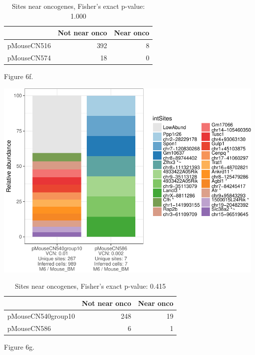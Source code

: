 \documentclass[12pt,]{article}
\begin{document}
\begin{table}[!h]

\caption{\label{tab:unnamed-chunk-3}Sites near oncogenes, Fisher's exact p-value: 1.000}
\centering
\begin{tabular}[t]{lrr}
\toprule
  & Not near onco & Near onco\\
\midrule
pMouseCN516 & 392 & 8\\
pMouseCN574 & 18 & 0\\
\bottomrule
\end{tabular}
\end{table}

\newpage

Figure 6f.

\includegraphics{project_files/figure-latex/unnamed-chunk-3-6.pdf}
\vspace{1.0cm}

\begin{table}[!h]

\caption{\label{tab:unnamed-chunk-3}Sites near oncogenes, Fisher's exact p-value: 0.415}
\centering
\begin{tabular}[t]{lrr}
\toprule
  & Not near onco & Near onco\\
\midrule
pMouseCN540group10 & 248 & 19\\
pMouseCN586 & 6 & 1\\
\bottomrule
\end{tabular}
\end{table}

\newpage

Figure 6g.
\end{document}
